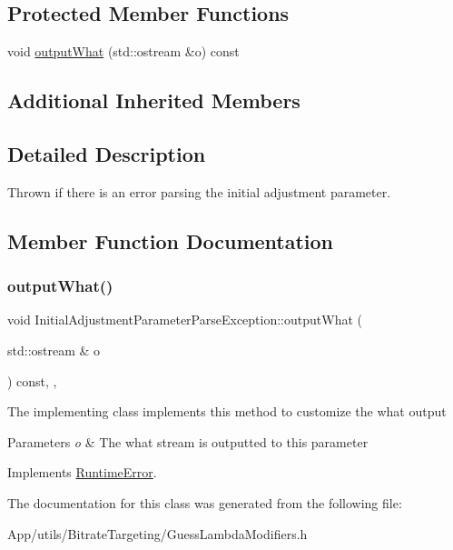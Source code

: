 \subsection*{Protected Member Functions}
\begin{DoxyCompactItemize}
\item 
void \hyperlink{class_initial_adjustment_parameter_parse_exception_a4ca2931ba18ec5cecb76b7891aa9d2eb}{output\+What} (std\+::ostream \&o) const
\end{DoxyCompactItemize}
\subsection*{Additional Inherited Members}


\subsection{Detailed Description}
Thrown if there is an error parsing the initial adjustment parameter. 

\subsection{Member Function Documentation}
\mbox{\label{class_initial_adjustment_parameter_parse_exception_a4ca2931ba18ec5cecb76b7891aa9d2eb}} 
\subsubsection{\texorpdfstring{output\+What()}{outputWhat()}}
{\footnotesize\ttfamily void Initial\+Adjustment\+Parameter\+Parse\+Exception\+::output\+What (\begin{DoxyParamCaption}\item[{std\+::ostream \&}]{o }\end{DoxyParamCaption}) const\hspace{0.3cm}{\ttfamily [inline]}, {\ttfamily [protected]}, {\ttfamily [virtual]}}

The implementing class implements this method to customize the what output 
\begin{DoxyParams}{Parameters}
{\em o} & The what stream is outputted to this parameter \\
\hline
\end{DoxyParams}


Implements \hyperlink{class_runtime_error_a5020b04a2a7fac8b1dbfbfe4a30055b0}{Runtime\+Error}.



The documentation for this class was generated from the following file\+:\begin{DoxyCompactItemize}
\item 
App/utils/\+Bitrate\+Targeting/Guess\+Lambda\+Modifiers.\+h\end{DoxyCompactItemize}
